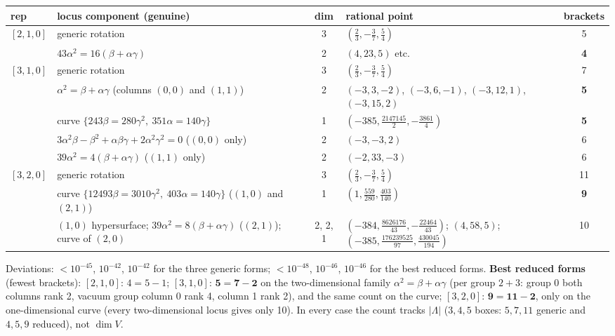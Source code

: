 \documentclass[10pt]{article}
\begin{document}
\begin{center}\footnotesize\setlength{\tabcolsep}{3pt}\begin{longtable}{@{}lp{6.3cm}cp{3.8cm}c@{}}\toprule
\textbf{rep} & \textbf{locus component (genuine)} & \textbf{dim} & \textbf{rational point} & \textbf{brackets} \\\midrule\endhead
$[2,1,0]$ & generic rotation & 3 & $(\tfrac23,-\tfrac37,\tfrac54)$ & 5 \\
 & $43\alpha^2=16(\beta+\alpha\gamma)$ & 2 & $(4,23,5)$ etc. & \textbf{4} \\
$[3,1,0]$ & generic rotation & 3 & $(\tfrac23,-\tfrac37,\tfrac54)$ & 7 \\
 & $\alpha^2=\beta+\alpha\gamma$ (columns $(0,0)$ and $(1,1)$) & 2 & $(-3,3,-2)$, $(-3,6,-1)$, $(-3,12,1)$, $(-3,15,2)$ & \textbf{5} \\
 & curve $\{243\beta=280\gamma^2,\ 351\alpha=140\gamma\}$ & 1 & $(-385,\tfrac{2147145}2,-\tfrac{3861}4)$ & \textbf{5} \\
 & $3\alpha^2\beta-\beta^2+\alpha\beta\gamma+2\alpha^2\gamma^2=0$ ($(0,0)$ only) & 2 & $(-3,-3,2)$ & 6 \\
 & $39\alpha^2=4(\beta+\alpha\gamma)$ ($(1,1)$ only) & 2 & $(-2,33,-3)$ & 6 \\
$[3,2,0]$ & generic rotation & 3 & $(\tfrac23,-\tfrac37,\tfrac54)$ & 11 \\
 & curve $\{12493\beta=3010\gamma^2,\ 403\alpha=140\gamma\}$ ($(1,0)$ and $(2,1)$) & 1 & $(1,\tfrac{559}{280},\tfrac{403}{140})$ & \textbf{9} \\
 & $(1,0)$ hypersurface; $39\alpha^2=8(\beta+\alpha\gamma)$ ($(2,1)$); curve of $(2,0)$ & 2, 2, 1 & $(-384,\tfrac{8626176}{43},-\tfrac{22464}{43})$; $(4,58,5)$; $(-385,\tfrac{176239525}{97},\tfrac{430045}{194})$ & 10 \\
\bottomrule\end{longtable}\end{center}
Deviations: $<10^{-45}$, $10^{-42}$, $10^{-42}$ for the three generic forms; $<10^{-48}$, $10^{-46}$, $10^{-46}$ for the best reduced forms. \textbf{Best reduced forms} (fewest brackets): $[2,1,0]$: $4=5-1$; $[3,1,0]$: $\mathbf{5=7-2}$ on the two-dimensional family $\alpha^2=\beta+\alpha\gamma$ (per group $2+3$: group 0 both columns rank 2, vacuum group column 0 rank 4, column 1 rank 2), and the same count on the curve; $[3,2,0]$: $\mathbf{9=11-2}$, only on the one-dimensional curve (every two-dimensional locus gives only 10). In every case the count tracks $|\Lambda|$ ($3,4,5$ boxes: $5,7,11$ generic and $4,5,9$ reduced), not $\dim V$.
\end{document}
